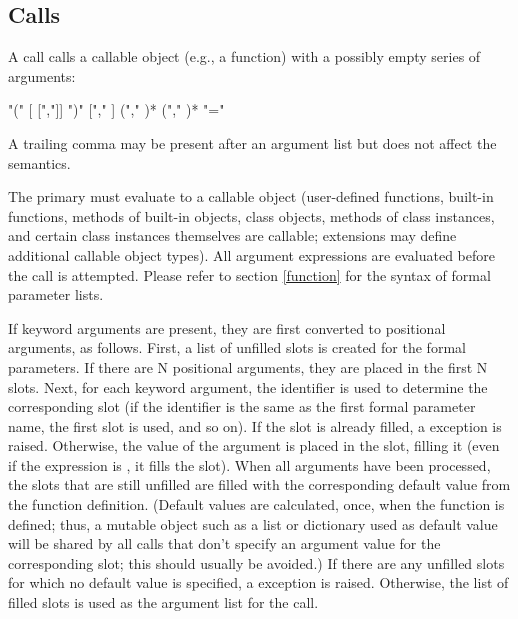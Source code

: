 \subsection{Calls\label{calls}}

A call calls a callable object (e.g., a function) with a possibly empty
series of arguments:

\begin{productionlist}
             { "(" [ [","]] ")"}
             { ["," ]}
             { ("," )*}
             { ("," )*}
             { "=" }
\end{productionlist}

A trailing comma may be present after an argument list but does not
affect the semantics.

The primary must evaluate to a callable object (user-defined
functions, built-in functions, methods of built-in objects, class
objects, methods of class instances, and certain class instances
themselves are callable; extensions may define additional callable
object types).  All argument expressions are evaluated before the call
is attempted.  Please refer to section \ref{function} for the syntax
of formal parameter lists.

If keyword arguments are present, they are first converted to
positional arguments, as follows.  First, a list of unfilled slots is
created for the formal parameters.  If there are N positional
arguments, they are placed in the first N slots.  Next, for each
keyword argument, the identifier is used to determine the
corresponding slot (if the identifier is the same as the first formal
parameter name, the first slot is used, and so on).  If the slot is
already filled, a  exception is raised.
Otherwise, the value of the argument is placed in the slot, filling it
(even if the expression is , it fills the slot).  When all
arguments have been processed, the slots that are still unfilled are
filled with the corresponding default value from the function
definition.  (Default values are calculated, once, when the function
is defined; thus, a mutable object such as a list or dictionary used
as default value will be shared by all calls that don't specify an
argument value for the corresponding slot; this should usually be
avoided.)  If there are any unfilled slots for which no default value
is specified, a  exception is raised.  Otherwise,
the list of filled slots is used as the argument list for the call.

